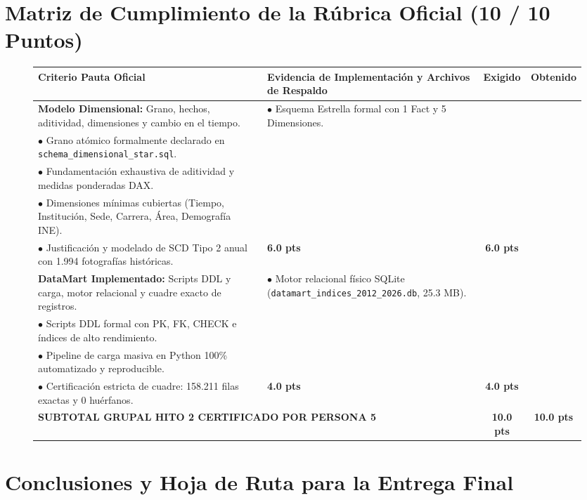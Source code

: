 \documentclass[11pt,a4paper]{article}
\begin{document}
\section{Matriz de Cumplimiento de la Rúbrica Oficial (10 / 10 Puntos)}
\label{sec:rubrica}

\begin{figure}[h!]
\centering
\begin{tabularx}{\textwidth}{p{4.5cm}Xcc}
\toprule
\textbf{Criterio Pauta Oficial} & \textbf{Evidencia de Implementación y Archivos de Respaldo} & \textbf{Exigido} & \textbf{Obtenido} \\
\midrule
\textbf{Modelo Dimensional:} Grano, hechos, aditividad, dimensiones y cambio en el tiempo. & 
$\bullet$ Esquema Estrella formal con 1 Fact y 5 Dimensiones.\\
$\bullet$ Grano atómico formalmente declarado en \texttt{schema\_dimensional\_star.sql}.\\
$\bullet$ Fundamentación exhaustiva de aditividad y medidas ponderadas DAX.\\
$\bullet$ Dimensiones mínimas cubiertas (Tiempo, Institución, Sede, Carrera, Área, Demografía INE).\\
$\bullet$ Justificación y modelado de SCD Tipo 2 anual con 1.994 fotografías históricas. & \textbf{6.0 pts} & \textbf{6.0 pts} \\
\midrule
\textbf{DataMart Implementado:} Scripts DDL y carga, motor relacional y cuadre exacto de registros. & 
$\bullet$ Motor relacional físico SQLite (\texttt{datamart\_indices\_2012\_2026.db}, 25.3 MB).\\
$\bullet$ Scripts DDL formal con PK, FK, CHECK e índices de alto rendimiento.\\
$\bullet$ Pipeline de carga masiva en Python 100\% automatizado y reproducible.\\
$\bullet$ Certificación estricta de cuadre: 158.211 filas exactas y 0 huérfanos. & \textbf{4.0 pts} & \textbf{4.0 pts} \\
\midrule
\multicolumn{2}{l}{\textbf{SUBTOTAL GRUPAL HITO 2 CERTIFICADO POR PERSONA 5}} & \textbf{10.0 pts} & \textbf{10.0 pts} \\
\bottomrule
\end{tabularx}
\end{figure}

\section{Conclusiones y Hoja de Ruta para la Entrega Final}
\label{sec:conclusiones}
\end{document}
